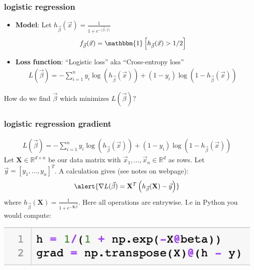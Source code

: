 \documentclass[handout,compress]{beamer}
\newcommand{\bv}[1]{\mathbf{#1}}
\newcommand{\R}{\mathbb{R}}
\begin{document}
\begin{frame}
	\frametitle{logistic regression}
	\begin{itemize}
		\item \textbf{Model}: Let $h_{\vec{\beta}}(\vec{x}) = \frac{1}{1 + e^{-\langle\vec{\beta},\vec{x}\rangle}}$
		\begin{align*}
		f_{\vec{\beta}}(\vec{x}) = \mathbbm{1}\left[h_{\vec{\beta}}(\vec{x})  > 1/2\right]
		\end{align*}
		\item \textbf{Loss function}: ``Logistic loss'' aka ``Cross-entropy loss''
		\begin{align*}
		L(\vec{\beta}) = - \sum_{i=1}^n y_i \log(h_{\vec{\beta}}(\vec{x})) + (1-y_i) \log(1 - h_{\vec{\beta}}(\vec{x})) 
		\end{align*}
	\end{itemize}
\begin{center}
	\large
	\alert{How do we find $\vec{\beta}$ which minimizes $L(\vec{\beta})$?}
\end{center}
\end{frame}

\begin{frame}
	\frametitle{logistic regression gradient}
	\vspace{-1em}
	\begin{align*}
	L(\vec{\beta}) = - \sum_{i=1}^n y_i \log(h_{\vec{\beta}}(\vec{x})) + (1-y_i) \log(1 - h_{\vec{\beta}}(\vec{x})) 
	\end{align*}
	Let $\bv{X}\in \R^{d\times n}$ be our data matrix with $\vec{x}_1, \ldots,\vec{x}_n \in \R^d$ as rows. Let $\vec{y} =[y_1, \ldots,  y_n]^T$. A calculation gives (see notes on webpage):
	\begin{align*}
		\alert{\nabla L(\vec{\beta})  = \bv{X}^T\left(h_{\vec{\beta}}(\bv{X}) - \vec{y}\right)}
	\end{align*}
	where $h_{\vec{\beta}}(\bv{X})  = \frac{1}{1+e^{-\bv{X}\vec{\beta}}}$. Here all operations are entrywise. I.e in Python you would compute:
	\vspace{-.5em}
	\begin{center}
		\includegraphics[width=.5\textwidth]{gradient_comp.png}
	\end{center}
\end{frame}
\end{document}
